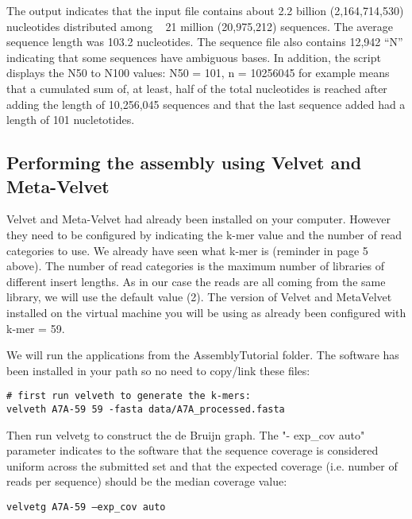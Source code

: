 The output indicates that the input file contains about 2.2 billion (2,164,714,530) nucleotides distributed among ~ 21 million (20,975,212) sequences. The average sequence length was 103.2 nucleotides. The sequence file also contains 12,942 “N” indicating that some sequences have ambiguous bases. In addition, the script displays the N50 to N100 values: 
N50 = 101, n = 10256045 for example means that a cumulated sum of, at least, half of the total nucleotides is reached after adding the length of 10,256,045 sequences and that the last sequence added had a length of 101 nucletotides.

\subsection{Performing the assembly using Velvet and Meta-Velvet}

Velvet and Meta-Velvet had already been installed on your computer. However they need to be configured by indicating the k-mer value and the number of read categories to use. We already have seen what k-mer is (reminder in page 5 above). The number of read categories is the maximum number of libraries of different insert lengths. As in our case the reads are all coming from the same library, we will use the default value (2).
The version of Velvet and MetaVelvet installed on the virtual machine you will be using as already been configured with k-mer = 59.

\begin{steps}
We will run the applications from the AssemblyTutorial folder. The software has been installed in your path so no need to copy/link these files:
\begin{lstlisting}
# first run velveth to generate the k-mers:
velveth A7A-59 59 -fasta data/A7A_processed.fasta 
\end{lstlisting}
\end{steps}

\begin{steps}
Then run velvetg to construct the de Bruijn graph. The "- exp\_cov auto" parameter indicates to the software that the sequence coverage is considered uniform across the submitted set and that the expected coverage (i.e. number of reads per sequence) should be the median coverage value:
\begin{lstlisting}
velvetg A7A-59 –exp_cov auto
\end{lstlisting}
\end{steps}

